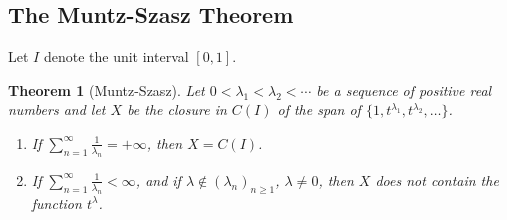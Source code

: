 \documentclass[11pt]{article}
\theoremstyle{thmstyle}
\newtheorem{theorem}{Theorem}[section]
\theoremstyle{defstyle}
\renewcommand{\ge}{\geqslant}
\begin{document}
\subsection{The Muntz-Szasz Theorem}

Let $I$ denote the unit interval $[0, 1]$.

\begin{theorem}[Muntz-Szasz]
    Let $0 < \lambda_1 < \lambda_2 < \cdots$ be a sequence of positive real numbers and let $X$ be the closure in $C(I)$ of the span of $\{1, t^{\lambda_1}, t^{\lambda_2},\dots\}$. 
    \begin{enumerate}[label=(\arabic*)]
        \item If $\displaystyle\sum_{n = 1}^\infty \frac{1}{\lambda_n} = +\infty$, then $X = C(I)$. \label{diverging-sum}
        \item If $\displaystyle\sum_{n = 1}^\infty \frac{1}{\lambda_n} < \infty$, and if $\lambda\notin(\lambda_n)_{n\ge 1}$, $\lambda\ne 0$, then $X$ does not contain the function $t^\lambda$. \label{converging-sum}
    \end{enumerate}
\end{theorem}
\end{document}
